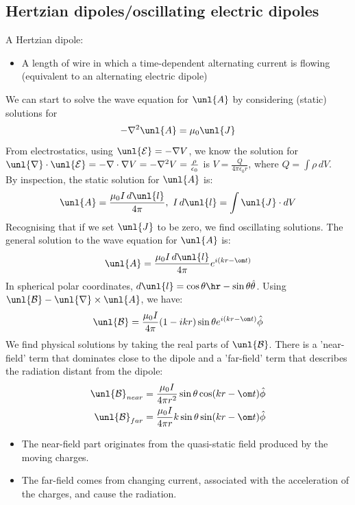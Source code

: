 \documentclass[a4paper, 11pt, normalem]{report}
\renewcommand\E{\mathcal{E}}
\newcommand\uE{\unl{\E}}
\renewcommand\B{\mathcal{B}}
\newcommand\uB{\unl{\B}}
\renewcommand\del{\unl{\nabla}}
\newcommand\eno{\epsilon_0}
\newcommand\J{\unl{J}}
\newcommand\A{\unl{A}}
\begin{document}
\subsection{Hertzian dipoles/oscillating electric dipoles}
A Hertzian dipole:
\begin{itemize}
	\item A length of wire in which a time-dependent alternating current is flowing (equivalent to an alternating electric dipole)
\end{itemize}
We can start to solve the wave equation for $\A$ by considering (static) solutions for
\begin{equation}
	-\nabla^2\A = \mu_0\J
\end{equation}
From electrostatics, using $\uE = -\nabla V$, we know the solution for $\del\cdot\uE = -\nabla\cdot\nabla V = -\nabla^2V = \frac{\rho}{\eno}$ is $V = \frac{Q}{4\pi\eno r}$, where $Q = \int \rho\,dV$. \\
By inspection, the static solution for $\A$ is:
\begin{equation}
	\A = \frac{\mu_0 I\,d\unl{l}}{4\pi},~ I\,d\unl{l} = \int \J\cdot dV
\end{equation}
Recognising that if we set $\J$ to be zero, we find oscillating solutions.
The general solution to the wave equation for $\A$ is:
\begin{equation}
	\A = \frac{\mu_0I\,d\unl{l}}{4\pi}e^{i(kr - \om t)}
\end{equation}
In spherical polar coordinates, $d\unl{l} = \cos\theta\hr - \sin\theta\hat{\theta}$.
Using $\uB - \del\times\A$, we have:
\begin{equation}
	\uB = \frac{\mu_0I}{4\pi}(1 - ikr)\sin\theta e^{i(kr - \om t)}\hat{\phi}
\end{equation}
We find physical solutions by taking the real parts of $\uB$.
There is a 'near-field' term that dominates close to the dipole and a 'far-field' term that describes the radiation distant from the dipole:
\begin{align}
	\uB_{near} &= \frac{\mu_0I}{4\pi r^2}\sin\theta \cos(kr - \om t)\hat{\phi} \\
	\uB_{far} &= \frac{\mu_0I}{4\pi r}k\sin\theta\sin(kr - \om t)\hat{\phi}
\end{align}
\begin{itemize}
	\item The near-field part originates from the quasi-static field produced by the moving charges.
	\item The far-field comes from changing current, associated with the acceleration of the charges, and cause the radiation.
\end{itemize}
\end{document}
